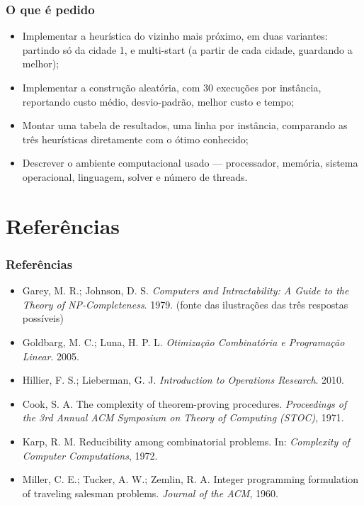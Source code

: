 \documentclass[fleqn]{beamer}
\begin{document}
\begin{frame}
	\frametitle{O que é pedido}
	\begin{itemize}
		\item Implementar a heurística do vizinho mais próximo, em duas
			variantes: partindo só da cidade 1, e multi-start (a partir de
			cada cidade, guardando a melhor);
		\item Implementar a construção aleatória, com 30 execuções por
			instância, reportando custo médio, desvio-padrão, melhor custo
			e tempo;
		\item Montar uma tabela de resultados, uma linha por instância,
			comparando as três heurísticas diretamente com o ótimo
			conhecido;
		\item Descrever o ambiente computacional usado — processador,
			memória, sistema operacional, linguagem, solver e número de
			threads.
	\end{itemize}
\end{frame}

\section{Referências}

\begin{frame}
	\frametitle{Referências}
	\begin{itemize}
		\item Garey, M. R.; Johnson, D. S. \textit{Computers and
			Intractability: A Guide to the Theory of NP-Completeness}.
			1979. (fonte das ilustrações das três respostas possíveis)
		\item Goldbarg, M. C.; Luna, H. P. L. \textit{Otimização
			Combinatória e Programação Linear}. 2005.
		\item Hillier, F. S.; Lieberman, G. J. \textit{Introduction to
			Operations Research}. 2010.
		\item Cook, S. A. The complexity of theorem-proving procedures.
			\textit{Proceedings of the 3rd Annual ACM Symposium on Theory
			of Computing (STOC)}, 1971.
		\item Karp, R. M. Reducibility among combinatorial problems. In:
			\textit{Complexity of Computer Computations}, 1972.
		\item Miller, C. E.; Tucker, A. W.; Zemlin, R. A. Integer
			programming formulation of traveling salesman problems.
			\textit{Journal of the ACM}, 1960.
	\end{itemize}
\end{frame}
\end{document}
